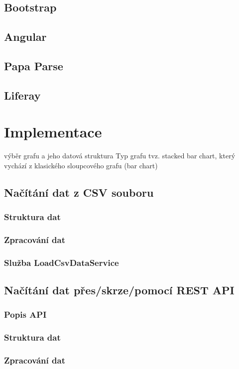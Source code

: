 \documentclass[
  digital, %
  oneside, %
  table,   %
  nolof,     %
  nolot,     %
]{fithesis3}
\begin{document}
\section{Bootstrap}
\section{Angular}
\section{Papa Parse}
\section{Liferay}

\chapter{Implementace}
výběr grafu a jeho datová struktura
Typ grafu tvz. stacked bar chart, který vychází z klasického sloupcového grafu (bar chart)

\section{Načítání dat z CSV souboru}
\subsection{Struktura dat}
\subsection{Zpracování dat}
\subsection{Služba LoadCsvDataService}

\section{Načítání dat přes/skrze/pomocí REST API}
\subsection{Popis API}
\subsection{Struktura dat}
\subsection{Zpracování dat}
\end{document}
